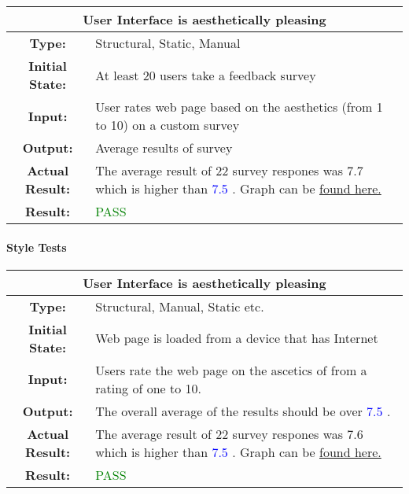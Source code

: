 \documentclass[12pt, titlepage]{article}
\newcommand{\acceptableRating}{\textcolor{blue}{7.5 }}
\begin{document}
\begin{center}
\begin{table}[H]
\begin{tabularx}{\textwidth}{| c X |}
\hline
\multicolumn{2}{|c|}{\textbf{User Interface is aesthetically pleasing}}\\
\hline
\textbf{Type: } & Structural, Static, Manual\\
\textbf{Initial State: } & At least 20 users take a feedback survey\\
\textbf{Input: } & User rates web page based on the aesthetics (from 1 to 10) on a custom survey\\
\textbf{Output: } & Average results of survey \\
\textbf{Actual Result:  } & The average result of 22 survey respones was 7.7 which is higher than \acceptableRating. Graph can be \href{run:./NFR1.PNG}{found here.} \\
\textbf{Result: } & \textcolor{green}{PASS}\\
\hline
\end{tabularx}
\end{table}
\end{center}

\paragraph{Style Tests}

\begin{center}
\begin{table}[H]
\begin{tabularx}{\textwidth}{| c X |}
\hline
\multicolumn{2}{|c|}{\textbf{User Interface is aesthetically pleasing}} \\
\hline
\textbf{Type: } & Structural, Manual, Static etc. \\
\textbf{Initial State: } & Web page is loaded from a device that has Internet \\
\textbf{Input: } &  Users rate the web page on the ascetics of from a rating of one to 10. \\
\textbf{Output: } &  The overall average of the results should be over \acceptableRating. \\
\textbf{Actual Result: } &  The average result of 22 survey respones was 7.6 which is higher than \acceptableRating. Graph can be \href{run:./NFR2.PNG}{found here.} \\
\textbf{Result: } & \textcolor{green}{PASS}\\
\hline

\end{tabularx}
\end{table}
\end{center}
\end{document}
